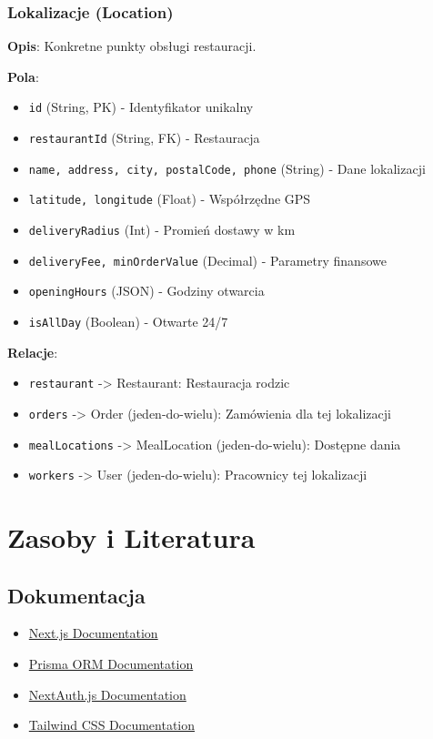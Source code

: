 \documentclass[12pt,a4paper,utf-8]{article}
\begin{document}
\subsubsection{Lokalizacje (Location)}

\textbf{Opis}: Konkretne punkty obsługi restauracji.

\textbf{Pola}:
\begin{itemize}
    \item \texttt{id} (String, PK) - Identyfikator unikalny
    \item \texttt{restaurantId} (String, FK) - Restauracja
    \item \texttt{name, address, city, postalCode, phone} (String) - Dane lokalizacji
    \item \texttt{latitude, longitude} (Float) - Współrzędne GPS
    \item \texttt{deliveryRadius} (Int) - Promień dostawy w km
    \item \texttt{deliveryFee, minOrderValue} (Decimal) - Parametry finansowe
    \item \texttt{openingHours} (JSON) - Godziny otwarcia
    \item \texttt{isAllDay} (Boolean) - Otwarte 24/7
\end{itemize}

\textbf{Relacje}:
\begin{itemize}
    \item \texttt{restaurant} -> Restaurant: Restauracja rodzic
    \item \texttt{orders} -> Order (jeden-do-wielu): Zamówienia dla tej lokalizacji
    \item \texttt{mealLocations} -> MealLocation (jeden-do-wielu): Dostępne dania
    \item \texttt{workers} -> User (jeden-do-wielu): Pracownicy tej lokalizacji
\end{itemize}

\newpage

\section{Zasoby i Literatura}

\subsection{Dokumentacja}

\begin{itemize}
    \item \href{https://nextjs.org/}{Next.js Documentation}
    \item \href{https://www.prisma.io/}{Prisma ORM Documentation}
    \item \href{https://next-auth.js.org/}{NextAuth.js Documentation}
    \item \href{https://tailwindcss.com/}{Tailwind CSS Documentation}
\end{itemize}
\end{document}
